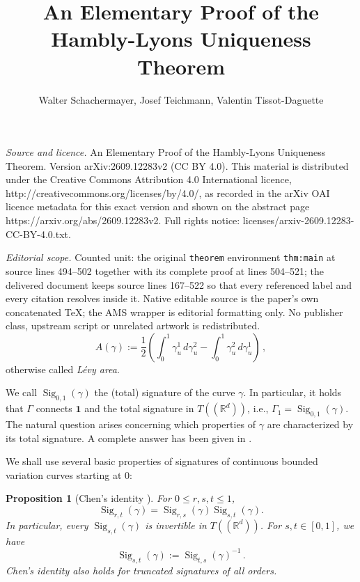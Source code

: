 \documentclass[10pt,a4paper]{amsart}
\newtheorem{proposition}[theorem]{Proposition}
\newcommand{\R}{\mathbb{R}}
\newcommand{\Sig}{\operatorname{Sig}}
\newcommand{\id}{\mathbf{1}}
\begin{document}
\title[An Elementary Proof of the Hambly-Lyons Uniqueness Theorem]{An Elementary Proof of the Hambly-Lyons Uniqueness Theorem}
\author{Walter Schachermayer, Josef Teichmann, Valentin Tissot-Daguette}
\date{}
\maketitle
\noindent\emph{Source and licence.} An Elementary Proof of the Hambly-Lyons Uniqueness Theorem. Version arXiv:2609.12283v2 (CC BY 4.0). This material is distributed under the Creative Commons Attribution 4.0 International licence, http://creativecommons.org/licenses/by/4.0/, as recorded in the arXiv OAI licence metadata for this exact version and shown on the abstract page https://arxiv.org/abs/2609.12283v2. Full rights notice: licenses/arxiv-2609.12283-CC-BY-4.0.txt.\par\smallskip
\noindent\textit{Editorial scope.} Counted unit: the original \texttt{theorem} environment \texttt{thm:main} at source lines 494--502 together with its complete proof at lines 504--521; the delivered document keeps source lines 167--522 so that every referenced label and every citation resolves inside it. Native editable source is the paper's own concatenated TeX; the AMS wrapper is editorial formatting only. No publisher class, upstream script or unrelated artwork is redistributed.
\begin{equation}\label{eq:LevyArea}
      A(\gamma)
  :=
  \frac12\left(\int_0^1 \gamma^1_u\,d\gamma^2_u
  -\int_0^1 \gamma^2_u\,d\gamma^1_u\right) \, ,
\end{equation}
otherwise called \emph{Lévy area}.

We call $ \Sig_{0,1}(\gamma)$ the (total) signature of the curve $\gamma$. In particular, it holds that $\Gamma$ connects $\id$ and the total signature in $T((\R^d))$, i.e., $\Gamma_1=\Sig_{0,1}(\gamma)$. The natural question arises concerning which properties of $\gamma$ are characterized by its total signature. A complete answer has been given in \cite{HL2010}.

We shall use several basic properties of signatures of continuous bounded variation curves starting at $0$:

\begin{proposition}[Chen's identity \cite{C1954}]\label{prop:chen}
For $ 0\leq r, s, t \leq 1$,
\[
  \Sig_{r,t}(\gamma)=\Sig_{r,s}(\gamma)\Sig_{s,t}(\gamma).
\]
In particular, every $\Sig_{s,t}(\gamma)$ is invertible in $T((\mathbb{R}^d))$. For $ s,t \in [0,1]$, we have
\[
  \Sig_{s,t}(\gamma):=\Sig_{t,s}(\gamma)^{-1} \, .
\]
Chen's identity also holds for truncated signatures of all orders.
\end{proposition}
\end{document}
